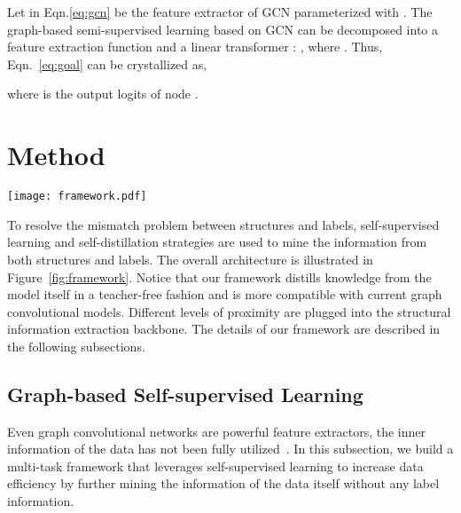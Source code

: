 \documentclass[letterpaper]{article} \usepackage{aaai22} \usepackage{times} \usepackage{helvet} \usepackage{courier} \usepackage[hyphens]{url} \usepackage{graphicx} \urlstyle{rm} \def\UrlFont{\rm} \usepackage{subfigure}
\begin{document}
	Let  in Eqn.\eqref{eq:gcn} be the feature extractor of GCN parameterized with . The graph-based semi-supervised learning based on GCN can be decomposed into a feature extraction function  and a linear transformer : , where . Thus, Eqn.~\eqref{eq:goal} can be crystallized as,
	
	where  is the output logits of node .
	
	\section{Method}
	
	\begin{figure*}[htb]
		\centering
		\texttt{[image: framework.pdf]}
		\caption{The overview of our framework. The left side gives the process of building the self-supervision tasks. The right side describes the self-distillation process where the teacher network (top) and the student network (bottom) share the same structures. The teacher and student network both consist of a classification pipeline and a self-supervision pipeline, where the same feature extraction backbone is used for the two pipelines. The distillation is accomplished from the classification outputs, self-supervision outputs, and middle-layer outputs.}
		\label{fig:framework}
	\end{figure*}
	
	To resolve the mismatch problem between structures and labels, self-supervised learning and self-distillation strategies are used to mine the information from both structures and labels. The overall architecture is illustrated in Figure~\ref{fig:framework}. Notice that our framework distills knowledge from the model itself in a teacher-free fashion and is more compatible with current graph convolutional models. Different levels of proximity are plugged into the structural information extraction backbone. The details of our framework are described in the following subsections.
	
	\subsection{Graph-based Self-supervised Learning}
	Even graph convolutional networks are powerful feature extractors, the inner information of the data has not been fully utilized~\cite{wan2021contrastive}. In this subsection, we build a multi-task framework that leverages self-supervised learning to increase data efficiency by further mining the information of the data itself without any label information. 
	
\end{document}
